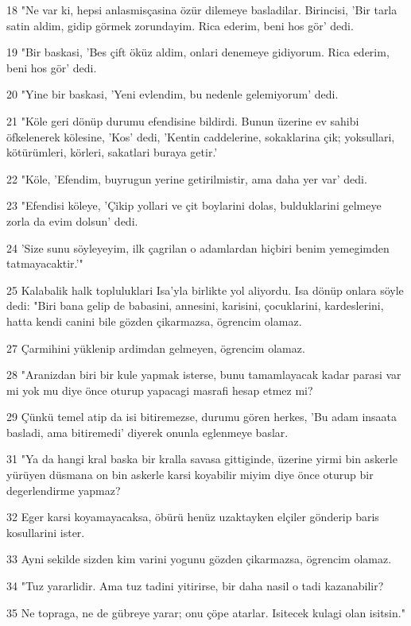 \par 18 "Ne var ki, hepsi anlasmisçasina özür dilemeye basladilar. Birincisi, 'Bir tarla satin aldim, gidip görmek zorundayim. Rica ederim, beni hos gör' dedi.
\par 19 "Bir baskasi, 'Bes çift öküz aldim, onlari denemeye gidiyorum. Rica ederim, beni hos gör' dedi.
\par 20 "Yine bir baskasi, 'Yeni evlendim, bu nedenle gelemiyorum' dedi.
\par 21 "Köle geri dönüp durumu efendisine bildirdi. Bunun üzerine ev sahibi öfkelenerek kölesine, 'Kos' dedi, 'Kentin caddelerine, sokaklarina çik; yoksullari, kötürümleri, körleri, sakatlari buraya getir.'
\par 22 "Köle, 'Efendim, buyrugun yerine getirilmistir, ama daha yer var' dedi.
\par 23 "Efendisi köleye, 'Çikip yollari ve çit boylarini dolas, bulduklarini gelmeye zorla da evim dolsun' dedi.
\par 24 'Size sunu söyleyeyim, ilk çagrilan o adamlardan hiçbiri benim yemegimden tatmayacaktir.'"
\par 25 Kalabalik halk topluluklari Isa'yla birlikte yol aliyordu. Isa dönüp onlara söyle dedi: "Biri bana gelip de babasini, annesini, karisini, çocuklarini, kardeslerini, hatta kendi canini bile gözden çikarmazsa, ögrencim olamaz.
\par 27 Çarmihini yüklenip ardimdan gelmeyen, ögrencim olamaz.
\par 28 "Aranizdan biri bir kule yapmak isterse, bunu tamamlayacak kadar parasi var mi yok mu diye önce oturup yapacagi masrafi hesap etmez mi?
\par 29 Çünkü temel atip da isi bitiremezse, durumu gören herkes, 'Bu adam insaata basladi, ama bitiremedi' diyerek onunla eglenmeye baslar.
\par 31 "Ya da hangi kral baska bir kralla savasa gittiginde, üzerine yirmi bin askerle yürüyen düsmana on bin askerle karsi koyabilir miyim diye önce oturup bir degerlendirme yapmaz?
\par 32 Eger karsi koyamayacaksa, öbürü henüz uzaktayken elçiler gönderip baris kosullarini ister.
\par 33 Ayni sekilde sizden kim varini yogunu gözden çikarmazsa, ögrencim olamaz.
\par 34 "Tuz yararlidir. Ama tuz tadini yitirirse, bir daha nasil o tadi kazanabilir?
\par 35 Ne topraga, ne de gübreye yarar; onu çöpe atarlar. Isitecek kulagi olan isitsin."

